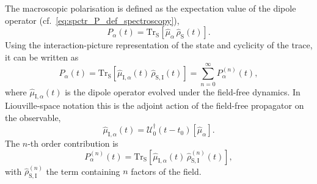The macroscopic polarisation is defined as the expectation value of the dipole operator (cf.~\autoref{eq:spctr_P_def_spectroscopy}),
\begin{equation*}
	P_\alpha(t)
	= \mathrm{Tr}_{\mathrm{S}}\!\left[\hat{\mu}_\alpha\,\hat{\rho}_{\mathrm{S}}(t)\right].
\end{equation*}
Using the interaction-picture representation of the state and cyclicity of the trace, it can be written as
\begin{equation*}
	P_\alpha(t)
	= \mathrm{Tr}_{\mathrm{S}}\!\left[\hat{\mu}_{\mathrm I,\alpha}(t)\,\hat{\rho}_{\mathrm{S,I}}(t)\right]
	= \sum_{n=0}^{\infty} P^{(n)}_\alpha(t),
\end{equation*}
where $\hat{\mu}_{\mathrm I,\alpha}(t)$ is the dipole operator evolved under the field-free dynamics. In Liouville-space notation this is the adjoint action of the field-free propagator on the observable,
\begin{equation*}
	\hat{\mu}_{\mathrm I,\alpha}(t)=\mathcal{U}_0^{\dagger}(t-t_0)[\hat{\mu}_\alpha].
\end{equation*}
The $n$-th order contribution is
\begin{equation*}
	P^{(n)}_\alpha(t) = \mathrm{Tr}_{\mathrm{S}}\!\left[\hat{\mu}_{\mathrm I,\alpha}(t)\,\hat{\rho}_{\mathrm{S,I}}^{(n)}(t)\right],
\end{equation*}
with $\hat{\rho}_{\mathrm{S,I}}^{(n)}$ the term containing $n$ factors of the field.

